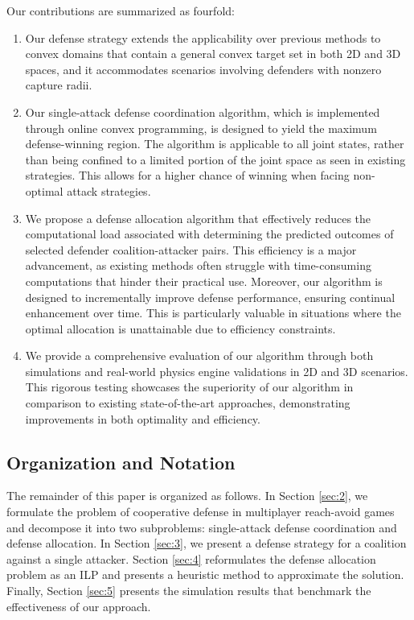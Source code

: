 \documentclass[journal]{IEEEtran}
\newcommand{\1}{\mathbf{1}}
\begin{document}
Our contributions are summarized as fourfold:

\begin{enumerate}
    \item Our defense strategy extends the applicability over previous methods to convex domains that contain a general convex target set in both 2D and 3D spaces, and it accommodates scenarios involving defenders with nonzero capture radii.
    \item Our single-attack defense coordination algorithm, which is implemented through online convex programming, is designed to yield the maximum defense-winning region. The algorithm is applicable to all joint states, rather than being confined to a limited portion of the joint space as seen in existing strategies. This allows for a higher chance of winning when facing non-optimal attack strategies.
    \item We propose a defense allocation algorithm that effectively reduces the computational load associated with determining the predicted outcomes of selected defender coalition-attacker pairs. This efficiency is a major advancement, as existing methods often struggle with time-consuming computations that hinder their practical use. Moreover, our algorithm is designed to incrementally improve defense performance, ensuring continual enhancement over time. This is particularly valuable in situations where the optimal allocation is unattainable due to efficiency constraints.
    \item We provide a comprehensive evaluation of our algorithm through both simulations and real-world physics engine validations in 2D and 3D scenarios. This rigorous testing showcases the superiority of our algorithm in comparison to existing state-of-the-art approaches, demonstrating improvements in both optimality and efficiency. 
\end{enumerate}

\subsection{Organization and Notation}

The remainder of this paper is organized as follows. In Section \ref{sec:2}, we formulate the problem of cooperative defense in multiplayer reach-avoid games and decompose it into two subproblems: single-attack defense coordination and defense allocation. In Section \ref{sec:3}, we present a defense strategy for a coalition against a single attacker. Section \ref{sec:4} reformulates the defense allocation problem as an ILP and presents a heuristic method to approximate the solution. Finally, Section \ref{sec:5} presents the simulation results that benchmark the effectiveness of our approach.
\end{document}
